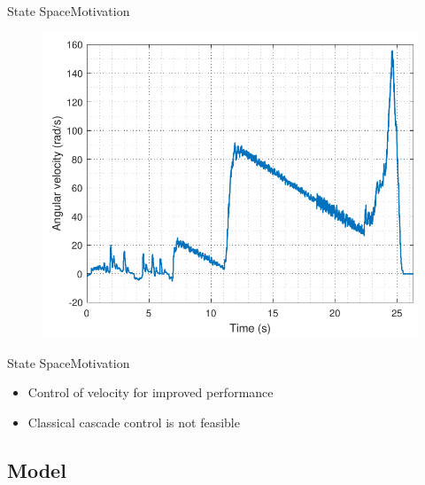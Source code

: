 \begin{frame}{State Space}{Motivation}
\begin{minipage}{\linewidth}
\begin{minipage}{0.45\linewidth}
  		\begin{figure}[H]
  			\includegraphics[scale=.35]{Pictures/wheelRLTest}
  			\centering
  		\end{figure}
  	\end{minipage}
  \end{minipage}
\end{frame}

\begin{frame}{State Space}{Motivation}
  \begin{itemize}
    \item Control of velocity for improved performance
    \item Classical cascade control is not feasible
  \end{itemize}
  \vspace{.2cm}
  \begin{figure}[H]
    \centering
    
  \end{figure}
\end{frame}

\subsection{Model}%

